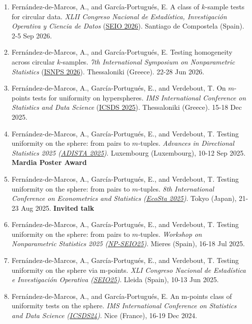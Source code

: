 \begin{enumerate}
  \item Fernández-de-Marcos, A., and García-Portugués, E. A class of $k$-sample tests for circular data. \emph{XLII Congreso Nacional de Estadística, Investigación Operativa y Ciencia de Datos} (\href{https://seio2026.com/es/}{SEIO 2026}). Santiago de Compostela (Spain). 2-5 Sep 2026.
  \item Fernández-de-Marcos, A., and García-Portugués, E. Testing homogeneity across circular $k$-samples. \emph{7th International Symposium on Nonparametric Statistics} (\href{https://easyconferences.eu/isnps2026/}{ISNPS 2026}). Thessaloniki (Greece). 22-28 Jun 2026.
  \item Fernández-de-Marcos, A., García-Portugués, E., and Verdebout, T. On $m$-points tests for uniformity on hyperspheres. \emph{IMS International Conference on Statistics and Data Science} (\href{https://sites.google.com/view/ims-icsds2025/}{ICSDS 2025}). Thessaloniki (Greece). 15-18 Dec 2025.
  \item Fernández-de-Marcos, A., García-Portugués, E., and Verdebout, T. Testing uniformity on the sphere: from pairs to $m$-tuples. \emph{Advances in Directional Statistics 2025 (\href{https://math.uni.lu/midas/events/adista25/}{ADISTA 2025})}. Luxembourg (Luxembourg), 10-12 Sep 2025. \textbf{Mardia Poster Award} 
  \item Fernández-de-Marcos, A., García-Portugués, E., and Verdebout, T. Testing uniformity on the sphere: from pairs to $m$-tuples. \emph{8th International Conference on Econometrics and Statistics (\href{https://www.cmstatistics.org/EcoSta2025/index.php}{EcoSta 2025})}. Tokyo (Japan), 21-23 Aug 2025. \textbf{Invited talk}
  \item Fernández-de-Marcos, A., García-Portugués, E., and Verdebout, T. Testing uniformity on the sphere: from pairs to $m$-tuples. \emph{Workshop on Nonparametric Statistics 2025 (\href{https://sites.google.com/view/wnpseio}{NP-SEIO25})}. Mieres (Spain), 16-18 Jul 2025.
  \item Fernández-de-Marcos, A., García-Portugués, E., and Verdebout, T. Testing uniformity on the sphere via m-points. \emph{XLI Congreso Nacional de Estadística e Investigación Operativa (\href{https://seio2025.com/}{SEIO25})}. Lleida (Spain), 10-13 Jun 2025.
  \item Fernández-de-Marcos, A., and García-Portugués, E. An m-points class of uniformity tests on the sphere. \emph{IMS International Conference on Statistics and Data Science (\href{https://sites.google.com/view/ims-icsds2024/}{ICSDS24})}. Nice (France), 16-19 Dec 2024.

\end{enumerate}

